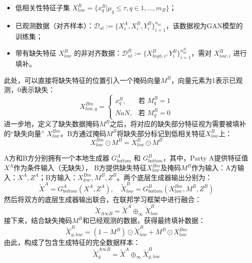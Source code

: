 \begin{itemize}[
	topsep=0pt,   %
	partopsep=0pt, %
	parsep=0pt,   %
	itemsep=0pt,   %
	]
	\item 低相关性特征子集 $X^B_{low} = \{ x_q^B | \mu_q \leq \tau, q \in {1,\dots,m_B}\}$；
	\item 已观测数据（对齐样本）：$\mathcal{D}_{al} := \{X^A_{i}, X^B_{i}, Y^B_{i}\}_{i=1}^{n_{al}}$，该数据视为GAN模型的训练集；
	\item 带有缺失特征 $X^B_{low}$ 的非对齐数据：$\mathcal{D}_{nl}^B := \{X^B_{high, i}, Y^B_{i}\}_{i=1}^{n^B_{nl}}$，需对 $X^B_{low,i}$ 进行填补。
\end{itemize}
此处，可以直接将缺失特征的位置引入一个掩码向量$M^B$，向量元素为1表示已观测，0表示缺失：
\begin{equation}
	X_{low,q}^{Bm} = 
	\begin{cases}
		x_q^B, & \text{若 } M_q^B=1\\[6pt]
		NaN, & \text{若 } M_q^B=0
	\end{cases}
\end{equation}
进一步地，定义了缺失数据掩码$M^B$之后，将对应的缺失部分特征视为需要被填补的“缺失向量” $X^{Bm}_{low}$。B方通过掩码$M^B$将缺失部分标记到低相关特征$X^B_{low}$上：
\begin{equation}
	X_{low}^{Bm} \odot M^B = X_{low}^{B}\odot M^B
\end{equation}

A方和B方分别拥有一个本地生成器 $G_{bottom}^A$ 和 $G_{bottom}^B$，其中，Party A提供特征值$X^A$作为条件输入（无缺失）， B方提供缺失特征$X^{Bm}_{low}$及掩码$M^B$作为输入：A方输入：$X^A, Z^A$；B方输入：$X^{Bm}_{low}, M^B, Z^B$。两个底层生成器输出分别为：
\begin{equation}
	\tilde{X}^A=G_{bottom}^A(X^{A},Z^A), \quad
	\tilde{X}^B_{low}=G_{bottom}^B(X^{Bm}_{low},M^B,Z^B)
\end{equation}
然后将双方的底层生成器输出联合，在联邦学习框架中进行融合：
\begin{equation}
	\tilde{X}_{A\infty B}=\tilde{X}^A\oplus_{\infty}\tilde{X}^B_{low}
\end{equation}
接下来，结合缺失掩码$M^B$和已经观测的数据，获得最终填补数据：
\begin{equation}
	\tilde{X}_{g,low}^{B} = (1-M^B)\odot\tilde{X}_{low}^B + M^B\odot X_{low}^{Bm}
\end{equation}
由此，构成了包含生成特征的完全数据样本：
\begin{equation}
	\tilde{X}_{g}^{A\infty B}=\tilde{X}^A\oplus_{\infty}\tilde{X}_{g,low}^B
\end{equation}

